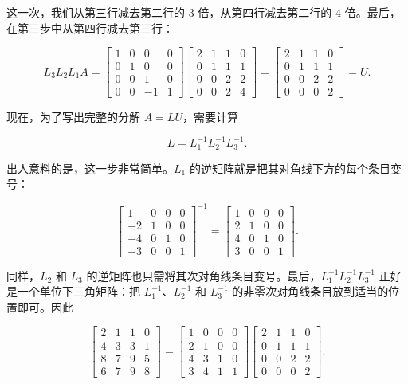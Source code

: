 \documentclass[UTF8,fontset=none,12pt]{ctexart}
\theoremstyle{definition}
\begin{document}
这一次，我们从第三行减去第二行的 3 倍，从第四行减去第二行的 4 倍。最后，在第三步中从第四行减去第三行：

\begin{equation*}
L_3L_2L_1A=
\begin{bmatrix}
1&0&0&0\\
0&1&0&0\\
0&0&1&0\\
0&0&-1&1
\end{bmatrix}
\begin{bmatrix}
2&1&1&0\\
0&1&1&1\\
0&0&2&2\\
0&0&2&4
\end{bmatrix}
=
\begin{bmatrix}
2&1&1&0\\
0&1&1&1\\
0&0&2&2\\
0&0&0&2
\end{bmatrix}
=U.
\end{equation*}

现在，为了写出完整的分解 $A=LU$，需要计算

$$
L=L_1^{-1}L_2^{-1}L_3^{-1}.
$$

出人意料的是，这一步非常简单。$L_1$ 的逆矩阵就是把其对角线下方的每个条目变号：

\begin{equation}
\begin{bmatrix}
1&0&0&0\\
-2&1&0&0\\
-4&0&1&0\\
-3&0&0&1
\end{bmatrix}^{-1}
=
\begin{bmatrix}
1&0&0&0\\
2&1&0&0\\
4&0&1&0\\
3&0&0&1
\end{bmatrix}.
\tag{20.4}
\end{equation}

同样，$L_2$ 和 $L_3$ 的逆矩阵也只需将其次对角线条目变号。最后，$L_1^{-1}L_2^{-1}L_3^{-1}$ 正好是一个单位下三角矩阵：把 $L_1^{-1}$、$L_2^{-1}$ 和 $L_3^{-1}$ 的非零次对角线条目放到适当的位置即可。因此

\begin{equation}
\begin{bmatrix}
2&1&1&0\\
4&3&3&1\\
8&7&9&5\\
6&7&9&8
\end{bmatrix}
=
\begin{bmatrix}
1&0&0&0\\
2&1&0&0\\
4&3&1&0\\
3&4&1&1
\end{bmatrix}
\begin{bmatrix}
2&1&1&0\\
0&1&1&1\\
0&0&2&2\\
0&0&0&2
\end{bmatrix}.
\tag{20.5}
\end{equation}
\end{document}
